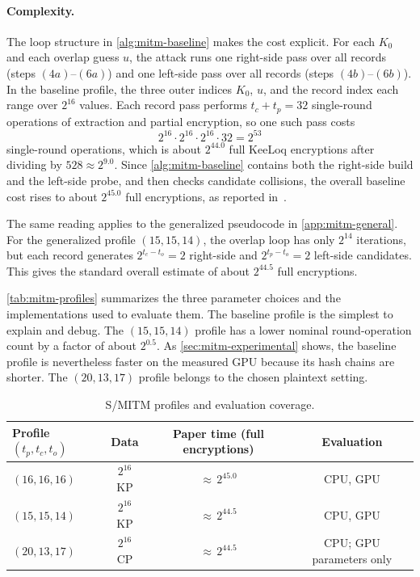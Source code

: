 \documentclass[version=preprint]{iacrcc}
\begin{document}
\paragraph{Complexity.}
The loop structure in \autoref{alg:mitm-baseline} makes the cost explicit.
For each $K_0$ and each overlap guess $u$, the attack runs one right-side pass over all records (steps $(4a)$--$(6a)$) and one left-side pass over all records (steps $(4b)$--$(6b)$).
In the baseline profile, the three outer indices $K_0$, $u$, and the record index each range over $2^{16}$ values.
Each record pass performs $t_c+t_p=32$ single-round operations of extraction and partial encryption, so one such pass costs
\[
2^{16} \cdot 2^{16} \cdot 2^{16} \cdot 32 = 2^{53}
\]
single-round operations, which is about $2^{44.0}$ full KeeLoq encryptions after dividing by $528 \approx 2^{9.0}$.
Since \autoref{alg:mitm-baseline} contains both the right-side build and the left-side probe, and then checks candidate collisions, the overall baseline cost rises to about $2^{45.0}$ full encryptions, as reported in~\cite{indesteege2008practical}.

The same reading applies to the generalized pseudocode in \autoref{app:mitm-general}.
For the generalized profile $(15,15,14)$, the overlap loop has only $2^{14}$ iterations, but each record generates $2^{t_c-t_o}=2$ right-side and $2^{t_p-t_o}=2$ left-side candidates.
This gives the standard overall estimate of about $2^{44.5}$ full encryptions.

\autoref{tab:mitm-profiles} summarizes the three parameter choices and the implementations used to evaluate them.
The baseline profile is the simplest to explain and debug.
The $(15,15,14)$ profile has a lower nominal round-operation count by a factor of about $2^{0.5}$.
As \autoref{sec:mitm-experimental} shows, the baseline profile is nevertheless faster on the measured GPU because its hash chains are shorter.
The $(20,13,17)$ profile belongs to the chosen plaintext setting.

\begin{table}[htbp]
  \centering
  \caption{S/MITM profiles and evaluation coverage.}
  \label{tab:mitm-profiles}
  \small
  \begin{tabular}{@{}lccc@{}}
    \toprule
    Profile $(t_p,t_c,t_o)$ & Data & Paper time (full encryptions) & Evaluation \\
    \midrule
    $(16,16,16)$ & $2^{16}$ KP & ${\approx}\,2^{45.0}$ & CPU, GPU \\
    $(15,15,14)$ & $2^{16}$ KP & ${\approx}\,2^{44.5}$ & CPU, GPU \\
    $(20,13,17)$ & $2^{16}$ CP & ${\approx}\,2^{44.5}$ & CPU; GPU parameters only \\
    \bottomrule
  \end{tabular}
\end{table}\nopagebreak
\end{document}
